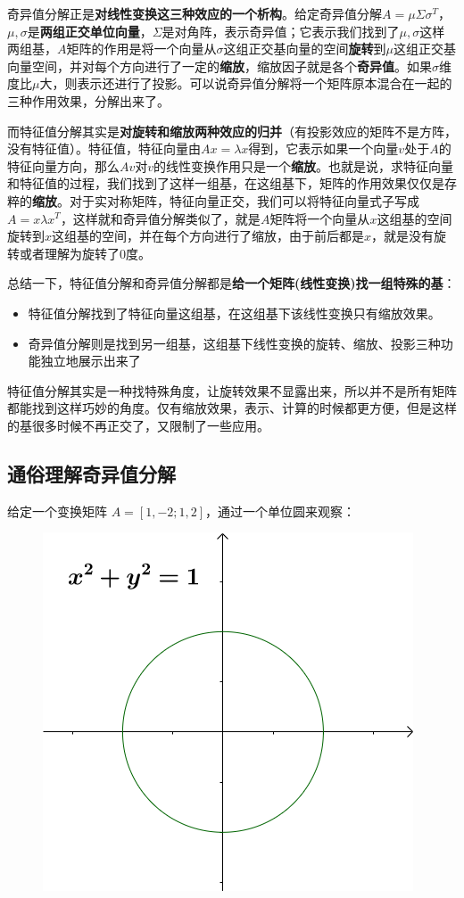 \documentclass[12pt]{article}
\begin{document}
奇异值分解正是\textbf{对线性变换这三种效应的一个析构}。给定奇异值分解$A = \mu\Sigma\sigma^T$，$\mu,\sigma$是\textbf{两组正交单位向量}，$\Sigma$是对角阵，表示奇异值；它表示我们找到了$\mu,\sigma$这样两组基，$A$矩阵的作用是将一个向量从$\sigma$这组正交基向量的空间\textbf{旋转}到$\mu$这组正交基向量空间，并对每个方向进行了一定的\textbf{缩放}，缩放因子就是各个\textbf{奇异值}。如果$\sigma$维度比$\mu$大，则表示还进行了投影。可以说奇异值分解将一个矩阵原本混合在一起的三种作用效果，分解出来了。

而特征值分解其实是\textbf{对旋转和缩放两种效应的归并}（有投影效应的矩阵不是方阵，没有特征值）。特征值，特征向量由$Ax=\lambda x$得到，它表示如果一个向量$v$处于$A$的特征向量方向，那么$Av$对$v$的线性变换作用只是一个\textbf{缩放}。也就是说，求特征向量和特征值的过程，我们找到了这样一组基，在这组基下，矩阵的作用效果仅仅是存粹的\textbf{缩放}。对于实对称矩阵，特征向量正交，我们可以将特征向量式子写成$A=x\lambda x^T$，这样就和奇异值分解类似了，就是$A$矩阵将一个向量从$x$这组基的空间旋转到$x$这组基的空间，并在每个方向进行了缩放，由于前后都是$x$，就是没有旋转或者理解为旋转了0度。

总结一下，特征值分解和奇异值分解都是\textbf{给一个矩阵(线性变换)找一组特殊的基}：
\begin{itemize}
    \item 特征值分解找到了特征向量这组基，在这组基下该线性变换只有缩放效果。
    
    \item 奇异值分解则是找到另一组基，这组基下线性变换的旋转、缩放、投影三种功能独立地展示出来了
\end{itemize}

特征值分解其实是一种找特殊角度，让旋转效果不显露出来，所以并不是所有矩阵都能找到这样巧妙的角度。仅有缩放效果，表示、计算的时候都更方便，但是这样的基很多时候不再正交了，又限制了一些应用。

\subsection{通俗理解奇异值分解}
给定一个变换矩阵 $A = [1, -2;1, 2]$，通过一个单位圆来观察：
\begin{figure}[H]
    \centering
    \includegraphics[width=.3\textwidth]{fig/UnderstandSingularValue_1.png}
\end{figure} 
\end{document}
